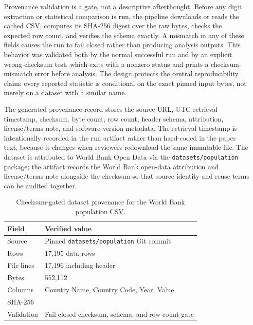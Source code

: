 \documentclass[sigconf,nonacm]{acmart}
\newcommand{\hashtt}[1]{\texttt{\seqsplit{#1}}}
\begin{document}
Provenance validation is a gate, not a descriptive afterthought. Before any digit extraction or statistical comparison is run, the pipeline downloads or reads the cached CSV, computes its SHA-256 digest over the raw bytes, checks the expected row count, and verifies the schema exactly. A mismatch in any of these fields causes the run to fail closed rather than producing analysis outputs. This behavior was validated both by the normal successful run and by an explicit wrong-checksum test, which exits with a nonzero status and prints a checksum-mismatch error before analysis. The design protects the central reproducibility claim: every reported statistic is conditional on the exact pinned input bytes, not merely on a dataset with a similar name.

The generated provenance record stores the source URL, UTC retrieval timestamp, checksum, byte count, row count, header schema, attribution, license/terms note, and software-version metadata. The retrieval timestamp is intentionally recorded in the run artifact rather than hard-coded in the paper text, because it changes when reviewers redownload the same immutable file. The dataset is attributed to World Bank Open Data via the \texttt{datasets/population} package; the artifact records the World Bank open-data attribution and license/terms note alongside the checksum so that source identity and reuse terms can be audited together.

\begin{table}[t]
\centering
\caption{Checksum-gated dataset provenance for the World Bank population CSV.}
\label{tab:dataset-provenance}
\begin{tabular}{@{}lp{}@{}}
\toprule
Field & Verified value \\
\midrule
Source & Pinned \texttt{datasets/population} Git commit \\
Rows & 17,195 data rows \\
File lines & 17,196 including header \\
Bytes & 552,112 \\
Columns & Country Name, Country Code, Year, Value \\
SHA-256 & \hashtt{7d2dd6a17f5ed7916de1f89a9c116791e64d207f2e2f6ce47c57e1ab46f0088a} \\
Validation & Fail-closed checksum, schema, and row-count gate \\
\bottomrule
\end{tabular}
\end{table}
\end{document}
